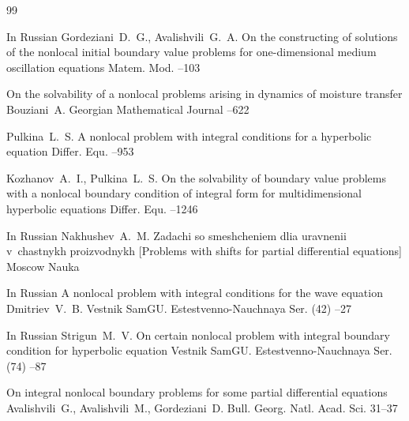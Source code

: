 \pagebreak

\EngRef



\begin{thebibliography}{99}

\lang In Russian
\by Gordeziani~D.~G., Avalishvili~G.~A.
\paper On the constructing of solutions of the nonlocal initial boundary value problems for one-dimensional medium oscillation equations
\jour Matem. Mod.
--103



\paper On the solvability of a nonlocal problems arising in dynamics of moisture transfer
\by Bouziani~A.
\jour Georgian Mathematical Journal
--622

\by Pulkina~L.~S.
\paper A nonlocal problem with integral conditions for a hyperbolic equation
\jour Differ. Equ.
--953 


\by Kozhanov~A.~I., Pulkina~L.~S.
\paper On the solvability of boundary value problems with a nonlocal boundary condition of integral form for multidimensional hyperbolic equations
\jour Differ. Equ. 
--1246 


\lang In Russian
\by Nakhushev~A.~M.
\book Zadachi so smeshcheniem dlia uravnenii v~chastnykh proizvodnykh \rm [Problems with shifts for partial differential equations]
\publaddr Moscow
\publ Nauka


\lang In Russian
\paper A nonlocal problem with integral conditions for the wave equation
\by    Dmitriev~V.~B.
\jour Vestnik SamGU. Estestvenno-Nauchnaya Ser.
(42)
--27

\lang In Russian
\by Strigun~M.~V.
\paper On certain nonlocal problem with integral boundary condition for hyperbolic equation
\jour Vestnik SamGU. Estestvenno-Nauchnaya Ser.
(74)
--87



\paper On integral nonlocal boundary problems for some partial differential equations
\by    Avalishvili~G., Avalishvili~M., Gordeziani~D.
\jour  Bull. Georg. Natl. Acad. Sci.
\pages \mbox{31--37}


\end{thebibliography}

